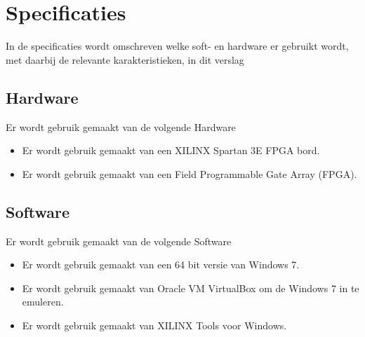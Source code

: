 \chapter{Specificaties}

In de specificaties wordt omschreven welke soft- en hardware er gebruikt wordt, met daarbij de relevante karakteristieken, in dit verslag


\section{Hardware}
Er wordt gebruik gemaakt van de volgende Hardware

\begin{itemize}
	\item Er wordt gebruik gemaakt van een XILINX Spartan 3E FPGA bord.
	\item Er wordt gebruik gemaakt van een Field Programmable Gate Array (FPGA). 
\end{itemize}

\section{Software}
 Er wordt gebruik gemaakt van de volgende Software
\begin{itemize}
	\item Er wordt gebruik gemaakt van een 64 bit versie van Windows 7.
	\item Er wordt gebruik gemaakt van Oracle VM VirtualBox om de Windows 7 in te emuleren.
	\item Er wordt gebruik gemaakt van XILINX Tools voor Windows.
\end{itemize}